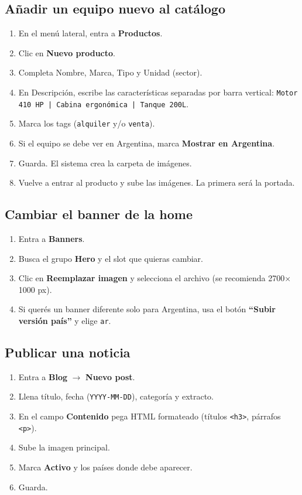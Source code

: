 \documentclass[11pt,a4paper]{article}
\begin{document}
\subsection{Añadir un equipo nuevo al catálogo}
\begin{enumerate}[leftmargin=*]
    \item En el menú lateral, entra a \textbf{Productos}.
    \item Clic en \textbf{Nuevo producto}.
    \item Completa Nombre, Marca, Tipo y Unidad (sector).
    \item En Descripción, escribe las características separadas por barra
        vertical: \texttt{Motor 410 HP | Cabina ergonómica | Tanque 200L}.
    \item Marca los tags (\texttt{alquiler} y/o \texttt{venta}).
    \item Si el equipo se debe ver en Argentina, marca \textbf{Mostrar en
        Argentina}.
    \item Guarda. El sistema crea la carpeta de imágenes.
    \item Vuelve a entrar al producto y sube las imágenes. La primera
        será la portada.
\end{enumerate}

\subsection{Cambiar el banner de la home}
\begin{enumerate}[leftmargin=*]
    \item Entra a \textbf{Banners}.
    \item Busca el grupo \textbf{Hero} y el slot que quieras cambiar.
    \item Clic en \textbf{Reemplazar imagen} y selecciona el archivo (se
        recomienda 2700$\times$1000 px).
    \item Si querés un banner diferente solo para Argentina, usa el botón
        \textbf{``Subir versión país''} y elige \texttt{ar}.
\end{enumerate}

\subsection{Publicar una noticia}
\begin{enumerate}[leftmargin=*]
    \item Entra a \textbf{Blog} $\rightarrow$ \textbf{Nuevo post}.
    \item Llena título, fecha (\texttt{YYYY-MM-DD}), categoría y extracto.
    \item En el campo \textbf{Contenido} pega HTML formateado (títulos
        \texttt{<h3>}, párrafos \texttt{<p>}).
    \item Sube la imagen principal.
    \item Marca \textbf{Activo} y los países donde debe aparecer.
    \item Guarda.
\end{enumerate}
\end{document}
